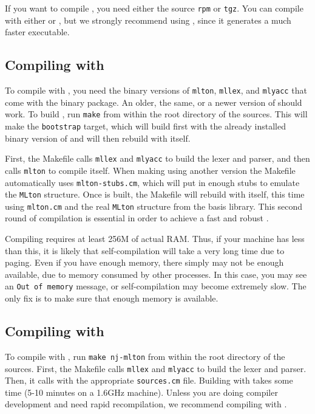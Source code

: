 
If you want to compile {\mlton}, you need either the source {\tt rpm}
or {\tt tgz}.  You can compile with either {\mlton} or {\smlnj}, but
we strongly recommend using {\mlton}, since it generates a much faster
executable.

\subsection{Compiling with {\mlton}}

To compile with {\mlton}, you need the binary versions of {\tt mlton},
{\tt mllex}, and {\tt mlyacc} that come with the {\mlton} binary
package.  An older, the same, or a newer version of {\mlton} should
work.  To build {\mlton}, run {\tt make} from within the root
directory of the sources.  This will make the {\tt bootstrap} target,
which will build {\mlton} first with the already installed binary
version of {\mlton} and will then rebuild {\mlton} with itself.

First, the Makefile calls {\tt mllex} and {\tt mlyacc} to build the
lexer and parser, and then calls {\tt mlton} to compile itself.  When
making {\mlton} using another version the Makefile automatically uses
{\tt mlton-stubs.cm}, which will put in enough stubs to emulate the
{\tt MLton} structure.  Once {\mlton} is built, the Makefile will
rebuild {\mlton} with itself, this time using {\tt mlton.cm} and the
real {\tt MLton} structure from the basis library.  This second round
of compilation is essential in order to achieve a fast and robust
{\mlton}.

Compiling {\mlton} requires at least 256M of actual RAM.  Thus, if
your machine has less than this, it is likely that self-compilation
will take a very long time due to paging.  Even if you have enough
memory, there simply may not be enough available, due to memory
consumed by other processes.  In this case, you may see an {\tt Out of
memory} message, or self-compilation may become extremely slow.  The
only fix is to make sure that enough memory is available.

\subsection{Compiling with {\smlnj}}

To compile with {\smlnj}, run {\tt make nj-mlton} from within the root
directory of the sources.  First, the Makefile calls {\tt mllex} and
{\tt mlyacc} to build the lexer and parser.  Then, it calls {\smlnj}
with the appropriate {\tt sources.cm} file.  Building with {\smlnj}
takes some time (5-10 minutes on a 1.6GHz machine).  Unless you are
doing compiler development and need rapid recompilation, we recommend
compiling with {\mlton}.
